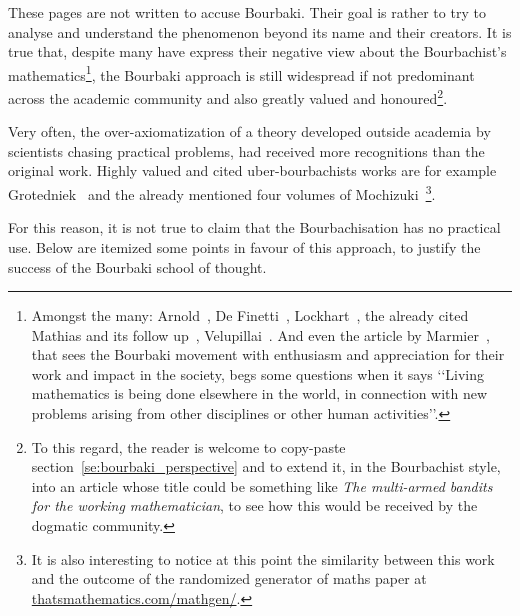 \documentclass[]{scrartcl}
\theoremstyle{definition}
\begin{document}


These pages are not written to accuse Bourbaki. Their goal is rather to try to analyse and understand the phenomenon beyond its name and their creators.
It is true that, despite many have express their negative view about the Bourbachist's mathematics\footnote{
    Amongst the many: Arnold~\cite{arnol1998teaching}, De Finetti~\cite{de2008bruno}, Lockhart~\cite{lockhart2009mathematician}, the already cited Mathias and its follow up~\cite{mathias1998further}, Velupillai~\cite{velupillai2012bourbaki}. And even the article by Marmier~\cite{marmier2014idea}, that sees the Bourbaki movement with enthusiasm and appreciation for their work and impact in the society, begs some questions when it says
    \lq\lq Living mathematics is being done elsewhere in the world, in connection with new problems arising from other disciplines or other human activities\rq\rq.
}, the Bourbaki approach is still widespread if not predominant across the academic community and also greatly valued and honoured\footnote{
    To this regard, the reader is welcome to copy-paste section~\ref{se:bourbaki_perspective} and to extend it, in the Bourbachist style, into an article whose title could be something like \emph{The multi-armed bandits for the working mathematician}, to see how this would be received by the dogmatic community.
}.

Very often, the over-axiomatization of a theory developed outside academia by scientists chasing practical problems, had received more recognitions than the original work.
Highly valued and cited uber-bourbachists works are for example Grotedniek~\cite{grothendieck2011some} and the already mentioned four volumes of Mochizuki~\cite{mochizuki2012inter}\footnote{
    It is also interesting to notice at this point the similarity between this work and the outcome of the randomized generator of maths paper at \href{https://thatsmathematics.com/mathgen/}{thatsmathematics.com/mathgen/}.
}.

For this reason, it is not true to claim that the Bourbachisation has no practical use. Below are itemized some points in favour of this approach, to justify the success of the Bourbaki school of thought.
\end{document}
